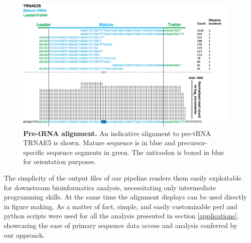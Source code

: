 \documentclass[12pt]{rockefeller}
\begin{document}
\begin{figure}[!ht]%
\centering
\includegraphics[width=5in]{pre.png}%
\caption[Pre-tRNA alignment]{\textbf{Pre-tRNA alignment.} An indicative alignment to pre-tRNA TRNAE5 is shown. Mature sequence is in blue and precursor-specific sequence segments in green. The anticodon is boxed in blue for orientation purposes.}
\centering
\label{pre}%
\end{figure}

The simplicity of the output files of our pipeline renders them easily exploitable for downstream bioinformatics analysis, necessitating only intermediate programming skills. At the same time the alignment displays can be used directly in figure making. As a matter of fact, simple, and easily customizable perl and python scripts were used for all the analysis presented in section \ref{applications}, showcasing the ease of primary sequence data access and analysis conferred by our approach.
\end{document}
